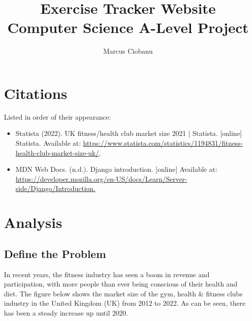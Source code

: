 \documentclass{article}
\title{Exercise Tracker Website \\ \vspace{10pt} \large Computer Science A-Level Project \normalsize}
\author{Marcus Ciobanu}
\date{}
\begin{document}
\maketitle
\newpage

\tableofcontents
\newpage

\section{Citations}
Listed in order of their appearance:
\begin{itemize}
  \item Statista (2022). UK fitness/health club market size 2021 | Statista. [online] Statista. Available at: \url{https://www.statista.com/statistics/1194831/fitness-health-club-market-size-uk/}.
  \item MDN Web Docs. (n.d.). Django introduction. [online] Available at: \url{https://developer.mozilla.org/en-US/docs/Learn/Server-side/Django/Introduction.}
\end{itemize}
\newpage

\section{Analysis}

\subsection{Define the Problem}
In recent years, the fitness industry has seen a boom in revenue and participation, with more people than ever being conscious of their health and diet. The figure below shows the market size of the gym, health \& fitness clubs industry in the United Kingdom (UK) from 2012 to 2022. As can be seen, there has been a steady increase up until 2020. 
\end{document}
